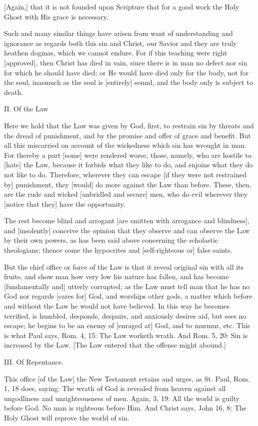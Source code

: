 [Again,] that it is not founded upon Scripture that for a good
work the Holy Ghost with His grace is necessary.

Such and many similar things have arisen from want of
understanding and ignorance as regards both this sin and
Christ, our Savior and they are truly heathen dogmas, which we
cannot endure. For if this teaching were right [approved],
then Christ has died in vain, since there is in man no defect
nor sin for which he should have died; or He would have died
only for the body, not for the soul, inasmuch as the soul is
[entirely] sound, and the body only is subject to death.


II. Of the Law

Here we hold that the Law was given by God, first, to restrain
sin by threats and the dread of punishment, and by the promise
and offer of grace and benefit. But all this miscarried on
account of the wickedness which sin has wrought in man. For
thereby a part [some] were rendered worse, those, namely, who
are hostile to [hate] the Law, because it forbids what they
like to do, and enjoins what they do not like to do.
Therefore, wherever they can escape [if they were not
restrained by] punishment, they [would] do more against the
Law than before. These, then, are the rude and wicked
[unbridled and secure] men, who do evil wherever they [notice
that they] have the opportunity.

The rest become blind and arrogant [are smitten with arrogance
and blindness], and [insolently] conceive the opinion that
they observe and can observe the Law by their own powers, as
has been said above concerning the scholastic theologians;
thence come the hypocrites and [self-righteous or] false
saints.

But the chief office or force of the Law is that it reveal
original sin with all its fruits, and show man how very low
his nature has fallen, and has become [fundamentally and]
utterly corrupted; as the Law must tell man that he has no God
nor regards [cares for] God, and worships other gods, a matter
which before and without the Law he would not have believed.
In this way he becomes terrified, is humbled, desponds,
despairs, and anxiously desires aid, but sees no escape; he
begins to be an enemy of [enraged at] God, and to murmur, etc.
This is what Paul says, Rom. 4, 15: The Law worketh wrath. And
Rom. 5, 20: Sin is increased by the Law. [The Law entered that
the offense might abound.]


III. Of Repentance.

This office [of the Law] the New Testament retains and urges,
as St. Paul, Rom. 1, 18 does, saying: The wrath of God is
revealed from heaven against all ungodliness and
unrighteousness of men. Again, 3, 19: All the world is guilty
before God. No man is righteous before Him. And Christ says,
John 16, 8: The Holy Ghost will reprove the world of sin.

